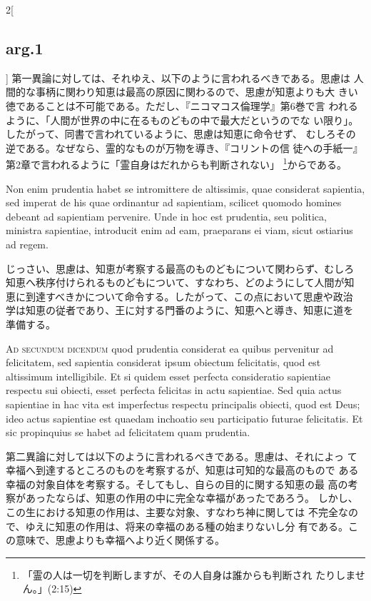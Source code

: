 \documentclass[paper=a4paper,fontsize=10pt,jafontsize=9pt,titlepage]{jlreq}
\begin{document}
\begin{paracol}{2}[\subsection{arg.1}]
第一異論に対しては、それゆえ、以下のように言われるべきである。思慮は
 人間的な事柄に関わり知恵は最高の原因に関わるので、思慮が知恵よりも大
 きい徳であることは不可能である。ただし、『ニコマコス倫理学』第6巻で言
 われるように、「人間が世界の中に在るものどもの中で最大だというのでな
 い限り」。したがって、同書で言われているように、思慮は知恵に命令せず、
 むしろその逆である。なぜなら、霊的なものが万物を導き、『コリントの信
 徒への手紙一』第2章で言われるように「霊自身はだれからも判断されない」
 \footnote{「霊の人は一切を判断しますが、その人自身は誰からも判断され
 たりしません。」(2:15) }からである。

\switchcolumn*

Non enim prudentia habet se intromittere de altissimis, quae
considerat sapientia, sed imperat de his quae ordinantur ad
sapientiam, scilicet quomodo homines debeant ad sapientiam
pervenire. Unde in hoc est prudentia, seu politica, ministra
sapientiae, introducit enim ad eam, praeparans ei viam, sicut
ostiarius ad regem.

\switchcolumn

じっさい、思慮は、知恵が考察する最高のものどもについて関わらず、むしろ
知恵へ秩序付けられるものどもについて、すなわち、どのようにして人間が知
恵に到達すべきかについて命令する。したがって、この点において思慮や政治
学は知恵の従者であり、王に対する門番のように、知恵へと導き、知恵に道を
準備する。

\switchcolumn*[\subsection{ad.2}]

{\scshape Ad secundum dicendum} quod prudentia considerat ea quibus
pervenitur ad felicitatem, sed sapientia considerat ipsum obiectum
felicitatis, quod est altissimum intelligibile. Et si quidem esset
perfecta consideratio sapientiae respectu sui obiecti, esset perfecta
felicitas in actu sapientiae. Sed quia actus sapientiae in hac vita
est imperfectus respectu principalis obiecti, quod est Deus; ideo
actus sapientiae est quaedam inchoatio seu participatio futurae
felicitatis. Et sic propinquius se habet ad felicitatem quam
prudentia.

\switchcolumn

第二異論に対しては以下のように言われるべきである。思慮は、それによっ
 て幸福へ到達するところのものを考察するが、知恵は可知的な最高のもので
 ある幸福の対象自体を考察する。そしてもし、自らの目的に関する知恵の最
 高の考察があったならば、知恵の作用の中に完全な幸福があったであろう。
 しかし、この生における知恵の作用は、主要な対象、すなわち神に関しては
 不完全なので、ゆえに知恵の作用は、将来の幸福のある種の始まりないし分
 有である。この意味で、思慮よりも幸福へより近く関係する。


\end{paracol}
\end{document}
